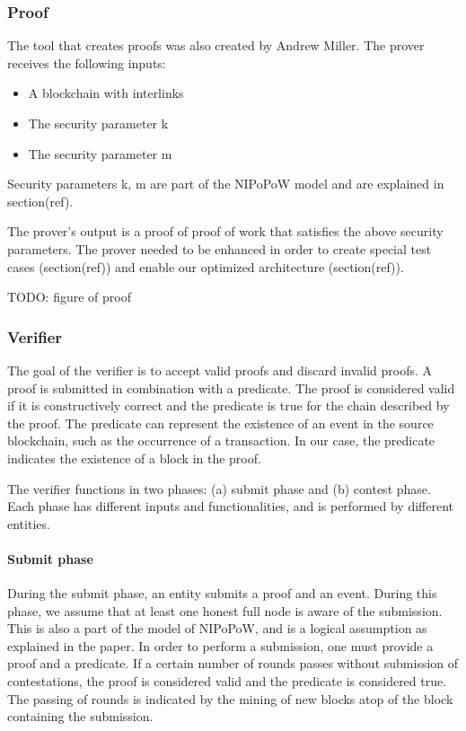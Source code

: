 \subsubsection{Proof}

The tool that creates proofs was also created by Andrew Miller. The
prover receives the following inputs:

\begin{itemize}
    \item
        A blockchain with interlinks
    \item
        The security parameter k
    \item
        The security parameter m
\end{itemize}

Security parameters k, m are part of the NIPoPoW model and are
explained in section(ref).

The prover’s output is a proof of proof of work that satisfies the
above security parameters. The prover needed to be enhanced in order
to create special test cases (section(ref)) and enable our optimized
architecture (section(ref)).

TODO: figure of proof

\subsubsection{Verifier}

The goal of the verifier is to accept valid proofs and discard invalid
proofs. A proof is submitted in combination with a predicate. The
proof is considered valid if it is constructively correct and the
predicate is true for the chain described by the proof. The predicate
can represent the existence of an event in the source blockchain, such
as the occurrence of a transaction. In our case, the predicate
indicates the existence of a block in the proof.

The verifier functions in two phases: (a) submit phase and (b) contest
phase. Each phase has different inputs and functionalities, and is
performed by different entities.

\paragraph{Submit phase} During the submit phase, an entity submits a
proof and an event. During this phase, we assume that at least one
honest full node is aware of the submission. This is also a part of
the model of NIPoPoW, and is a logical assumption as explained in the
paper. In order to perform a submission, one must provide a proof and
a predicate. If a certain number of rounds passes without submission
of contestations, the proof is considered valid and the predicate is
considered true. The passing of rounds is indicated by the mining of
new blocks atop of the block containing the submission.


